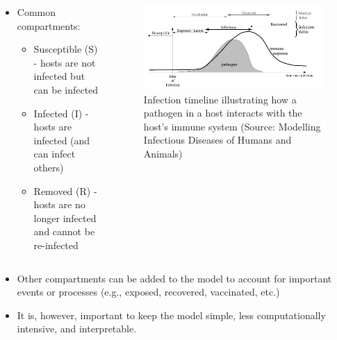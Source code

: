 \documentclass[
  ignorenonframetext,
]{beamer}
\providecommand{\tightlist}{%
  \setlength{\itemsep}{0pt}\setlength{\parskip}{0pt}}\usepackage{longtable,booktabs,array}
\begin{document}
\begin{frame}
\begin{columns}[T]
\begin{column}{0.6\textwidth}
\begin{itemize}
\tightlist
\item
  Common compartments:

  \begin{itemize}
  \tightlist
  \item
    Susceptible (S) - hosts are not infected but can be infected
  \item
    Infected (I) - hosts are infected (and can infect others)
  \item
    Removed (R) - hosts are no longer infected and cannot be re-infected
  \end{itemize}
\end{itemize}
\end{column}

\begin{column}{0.4\textwidth}
\begin{figure}[H]

{\centering \includegraphics{images/infection_timeline.png}

}

\caption{Infection timeline illustrating how a pathogen in a host
interacts with the host's immune system (Source: Modelling Infectious
Diseases of Humans and Animals)}

\end{figure}%
\end{column}
\end{columns}
\end{frame}

\begin{frame}
\begin{itemize}
\item
  Other compartments can be added to the model to account for important
  events or processes (e.g., exposed, recovered, vaccinated, etc.)
\item
  It is, however, important to keep the model simple, less
  computationally intensive, and interpretable.
\end{itemize}
\end{frame}
\end{document}
